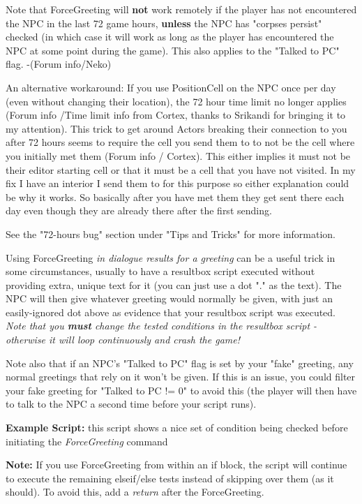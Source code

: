 Note that ForceGreeting will \textbf{not} work remotely if the player
has not encountered the NPC in the last 72 game hours, \textbf{unless}
the NPC has "corpses persist" checked (in which case it will work as
long as the player has encountered the NPC at some point during the
game). This also applies to the "Talked to PC" flag. -(Forum info/Neko)

An alternative workaround: If you use PositionCell on the NPC once per
day (even without changing their location), the 72 hour time limit no
longer applies (Forum info /Time limit info from Cortex, thanks to
Srikandi for bringing it to my attention). This trick to get around
Actors breaking their connection to you after 72 hours seems to require
the cell you send them to to not be the cell where you initially met
them (Forum info / Cortex). This either implies it must not be their
editor starting cell or that it must be a cell that you have not
visited. In my fix I have an interior I send them to for this purpose so
either explanation could be why it works. So basically after you have
met them they get sent there each day even though they are already there
after the first sending.

See the "72-hours bug" section under "Tips and Tricks" for more
information.

Using ForceGreeting \emph{in dialogue results for a greeting} can be a
useful trick in some circumstances, usually to have a resultbox script
executed without providing extra, unique text for it (you can just use a
dot "." as the text). The NPC will then give whatever greeting would
normally be given, with just an easily-ignored dot above as evidence
that your resultbox script was executed. \emph{Note that you
\textbf{must} change the tested conditions in the resultbox script -
otherwise it will loop continuously and crash the game!}

Note also that if an NPC's "Talked to PC" flag is set by your "fake"
greeting, any normal greetings that rely on it won't be given. If this
is an issue, you could filter your fake greeting for "Talked to PC != 0"
to avoid this (the player will then have to talk to the NPC a second
time before your script runs).

\textbf{Example Script:} this script shows a nice set of condition being
checked before initiating the \emph{ForceGreeting} command



\textbf{Note:} If you use ForceGreeting from within an if block, the
script will continue to execute the remaining elseif/else tests instead
of skipping over them (as it should). To avoid this, add a \emph{return}
after the ForceGreeting.


